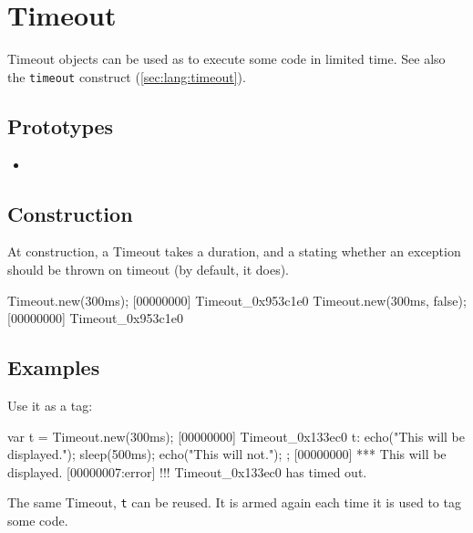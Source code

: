 
\section{Timeout}

Timeout objects can be used as  to execute some code in
limited time.  See also the \lstinline|timeout| construct
(\autoref{sec:lang:timeout}).

\subsection{Prototypes}
\begin{itemize}
\item {}
\end{itemize}

\subsection{Construction}
At construction, a Timeout takes a duration, and a 
stating whether an exception should be thrown on timeout (by default,
it does).

\begin{urbiscript}
Timeout.new(300ms);
[00000000] Timeout_0x953c1e0
Timeout.new(300ms, false);
[00000000] Timeout_0x953c1e0
\end{urbiscript}

\subsection{Examples}

Use it as a tag:

\begin{urbiscript}
var t = Timeout.new(300ms);
[00000000] Timeout_0x133ec0
t:{
  echo("This will be displayed.");
  sleep(500ms);
  echo("This will not.");
};
[00000000] *** This will be displayed.
[00000007:error] !!! Timeout_0x133ec0 has timed out.
\end{urbiscript}

The same Timeout, \lstinline|t| can be reused.  It is armed again each
time it is used to tag some code.


